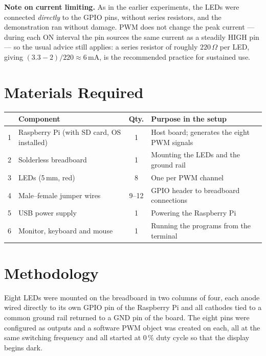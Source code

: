 \documentclass[10pt,a4paper]{article}
\begin{document}
\begin{notebox}
\textbf{Note on current limiting.} As in the earlier experiments, the LEDs were
connected \emph{directly} to the GPIO pins, without series resistors, and the
demonstration ran without damage. PWM does not change the peak current --- during each
ON interval the pin sources the same current as a steadily HIGH pin --- so the usual
advice still applies: a series resistor of roughly $220\,\Omega$ per LED, giving
$(3.3-2)/220 \approx 6\,\mathrm{mA}$, is the recommended practice for sustained use.
\end{notebox}

\section{Materials Required}

\noindent
\begin{tabularx}{\textwidth}{@{}p{0.4cm} >{\raggedright\arraybackslash}p{5.2cm} c X@{}}
\toprule
\rowcolor{soft}
\multicolumn{1}{@{}l}{\textbf{\#}} & \textbf{Component} & \textbf{Qty.} & \textbf{Purpose in the setup} \\
\midrule
1 & Raspberry Pi (with SD card, OS installed) & 1 & Host board; generates the eight PWM signals \\
2 & Solderless breadboard                     & 1 & Mounting the LEDs and the ground rail \\
3 & LEDs (5\,mm, red)                         & 8 & One per PWM channel \\
4 & Male--female jumper wires                 & 9--12 & GPIO header to breadboard connections \\
5 & USB power supply                          & 1 & Powering the Raspberry Pi \\
6 & Monitor, keyboard and mouse               & 1 & Running the programs from the terminal \\
\bottomrule
\end{tabularx}

\section{Methodology}

Eight LEDs were mounted on the breadboard in two columns of four, each anode wired
directly to its own GPIO pin of the Raspberry Pi and all cathodes tied to a common
ground rail returned to a GND pin of the board. The eight pins were configured as
outputs and a software PWM object was created on each, all at the same switching
frequency and all started at $0\,\%$ duty cycle so that the display begins dark.
\end{document}
